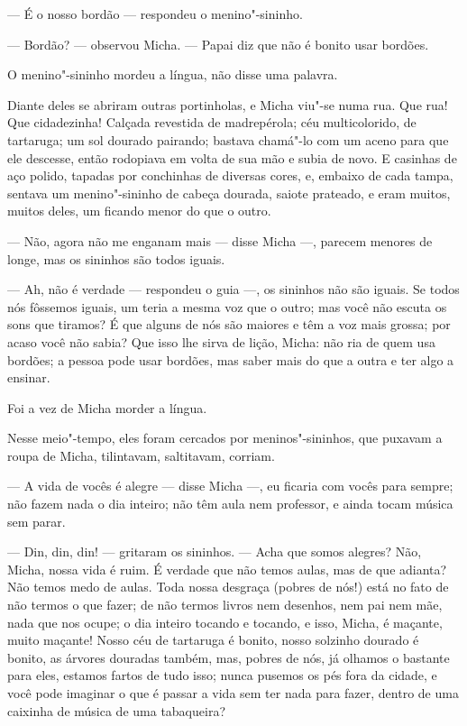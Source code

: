 --- É o nosso bordão --- respondeu o menino"-sininho.

--- Bordão? --- observou Micha. --- Papai diz que não é bonito usar
bordões.

O menino"-sininho mordeu a língua, não disse uma palavra.

Diante deles se abriram outras portinholas, e Micha viu"-se numa rua. Que
rua! Que cidadezinha! Calçada revestida de madrepérola; céu
multicolorido, de tartaruga; um sol dourado pairando; bastava
chamá"-lo com um aceno para que ele descesse, então rodopiava em volta de
sua mão e subia de novo. E casinhas de aço polido, tapadas por
conchinhas de diversas cores, e, embaixo de cada tampa, sentava um
menino"-sininho de cabeça dourada, saiote prateado, e eram muitos, muitos
deles, um ficando menor do que o outro.

--- Não, agora não me enganam mais --- disse Micha ---, parecem menores
de longe, mas os sininhos são todos iguais.

--- Ah, não é verdade --- respondeu o guia ---, os sininhos não são
iguais. Se todos nós fôssemos iguais, um teria a mesma voz que o outro;
mas você não escuta os sons que tiramos? É que alguns de nós são maiores
e têm a voz mais grossa; por acaso você não sabia? Que isso lhe sirva de
lição, Micha: não ria de quem usa bordões; a pessoa pode usar bordões,
mas saber mais do que a outra e ter algo a ensinar.

Foi a vez de Micha morder a língua.

Nesse meio"-tempo, eles foram cercados por meninos"-sininhos, que puxavam a
roupa de Micha, tilintavam, saltitavam, corriam.

--- A vida de vocês é alegre --- disse Micha ---, eu ficaria com vocês
para sempre; não fazem nada o dia inteiro; não têm aula nem professor, e
ainda tocam música sem parar.

--- Din, din, din! --- gritaram os sininhos. --- Acha que somos alegres?
Não, Micha, nossa vida é ruim. É verdade que não temos aulas, mas de que
adianta? Não temos medo de aulas. Toda nossa desgraça (pobres de nós!)
está no fato de não termos o que fazer; de não termos livros nem
desenhos, nem pai nem mãe, nada que nos ocupe; o dia inteiro tocando e
tocando, e isso, Micha, é maçante, muito maçante! Nosso céu de tartaruga
é bonito, nosso solzinho dourado é bonito, as árvores douradas também,
mas, pobres de nós, já olhamos o bastante para eles, estamos fartos de
tudo isso; nunca pusemos os pés fora da cidade, e você pode imaginar o
que é passar a vida sem ter nada para fazer, dentro de uma caixinha de
música de uma tabaqueira?

